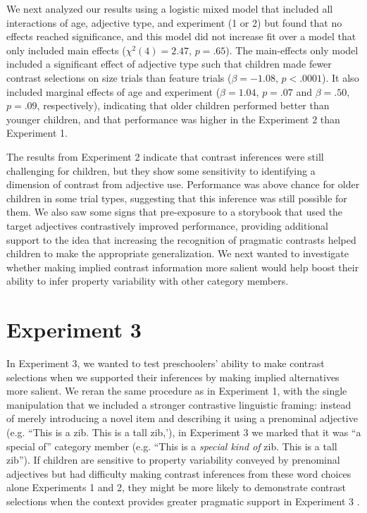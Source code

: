 \documentclass[man]{apa2}
\begin{document}
We next analyzed our results using a logistic mixed model that included all interactions of age, adjective type, and experiment (1 or 2) but found that no effects reached significance, and this model did not increase fit over a model that only included main effects ($\chi^2(4) = 2.47$, $p = .65$). The main-effects only model included a significant effect of adjective type such that children made fewer contrast selections on size trials than feature trials ($\beta = -1.08$, $p < .0001$). It also included marginal effects of age and experiment ($\beta = 1.04$, $p = .07$ and $\beta = .50$, $p = .09$, respectively), indicating that older children performed better than younger children, and that performance was higher in the Experiment 2 than Experiment 1. 

The results from Experiment 2 indicate that contrast inferences were still challenging for children, but they show some sensitivity to identifying a dimension of contrast from adjective use. Performance was above chance for older children in some trial types, suggesting that this inference was still possible for them.  We also saw some signs that pre-exposure to a storybook that used the target adjectives contrastively improved performance, providing additional support to the idea that increasing the recognition of pragmatic contrasts helped children to make the appropriate generalization. We next wanted to investigate whether making implied contrast information more salient would help boost their ability to infer property variability with other category members. 




\section{Experiment 3}

In Experiment 3, we wanted to test preschoolers' ability to make contrast selections when we supported their inferences by  making implied alternatives more salient. We reran the same procedure as in Experiment 1, with the single manipulation that we included a stronger contrastive linguistic framing: instead of merely introducing a novel item and describing it using a prenominal adjective (e.g. ``This is a zib. This is a tall zib,'), in Experiment 3 we marked that it was ``a special of'' category member (e.g. ``This is a \emph{special kind of} zib. This is a tall zib'').  If children are sensitive to property variability conveyed by prenominal adjectives but had difficulty making contrast inferences from these word choices alone Experiments 1 and 2, they might be more likely to demonstrate contrast selections when the context provides greater pragmatic support in Experiment 3 .
\end{document}

